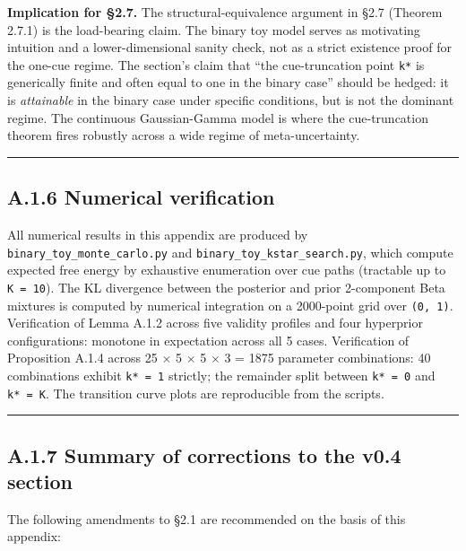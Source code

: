 \documentclass{article}
\begin{document}
\textbf{Implication for \S{}2.7.} The structural-equivalence argument in
\S{}2.7 (Theorem 2.7.1) is the load-bearing claim. The binary toy model
serves as motivating intuition and a lower-dimensional sanity check, not
as a strict existence proof for the one-cue regime. The section's claim
that ``the cue-truncation point \texttt{k*} is generically finite and
often equal to one in the binary case'' should be hedged: it is
\emph{attainable} in the binary case under specific conditions, but is
not the dominant regime. The continuous Gaussian-Gamma model is where
the cue-truncation theorem fires robustly across a wide regime of
meta-uncertainty.

\begin{center}\rule{0.5\linewidth}{0.5pt}\end{center}

\subsection{A.1.6 Numerical
verification}\label{a.1.6-numerical-verification}

All numerical results in this appendix are produced by
\texttt{binary\_toy\_monte\_carlo.py} and
\texttt{binary\_toy\_kstar\_search.py}, which compute expected free
energy by exhaustive enumeration over cue paths (tractable up to
\texttt{K\ =\ 10}). The KL divergence between the posterior and prior
2-component Beta mixtures is computed by numerical integration on a
2000-point grid over \texttt{(0,\ 1)}. Verification of Lemma A.1.2
across five validity profiles and four hyperprior configurations:
monotone in expectation across all 5 cases. Verification of Proposition
A.1.4 across 25 \ensuremath{\times} 5 \ensuremath{\times} 5 \ensuremath{\times} 3 = 1875 parameter combinations: 40
combinations exhibit \texttt{k*\ =\ 1} strictly; the remainder split
between \texttt{k*\ =\ 0} and \texttt{k*\ =\ K}. The transition curve
plots are reproducible from the scripts.

\begin{center}\rule{0.5\linewidth}{0.5pt}\end{center}

\subsection{A.1.7 Summary of corrections to the v0.4
section}\label{a.1.7-summary-of-corrections-to-the-v0.4-chapter}

The following amendments to \S{}2.1 are recommended on the basis of this
appendix:
\end{document}
